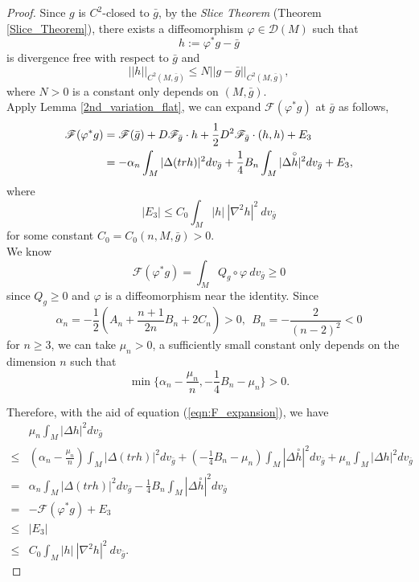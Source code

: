 \documentclass[12pt]{amsart}
\theoremstyle{definition}
\theoremstyle{remark}
\numberwithin{equation}{section}
\begin{document}
\begin{proof}

Since $g$ is $C^2$-closed to $\bar{g}$, by the \emph{Slice Theorem} (Theorem \ref{Slice_Theorem}), there exists a diffeomorphism $\varphi \in \mathscr{D}( M ) $ such that $$h := \varphi^* g - \bar{g}$$ is divergence free with respect to $\bar{g}$ and $$||h||_{C^2(M,\bar{g})} \leq N ||g-\bar{g}||_{C^2(M,\bar{g})},$$ where $N > 0$ is a constant only depends on $(M,\bar{g})$.\\

Apply Lemma \ref{2nd_variation_flat}, we can expand $\mathscr{F}(\varphi^*g)$ at $\bar{g}$ as follows,
\begin{align}\label{eqn:F_expansion}
\mathscr{F}(\varphi^*g) &= \mathscr{F}(\bar g) + D\mathscr{F}_{\bar g} \cdot h + \frac{1}{2}D^2 \mathscr{F}_{\bar g} \cdot (h, h) + E_3\\
\notag   &=   - \alpha_n \int_M|\Delta(tr h)|^2 dv_{\bar{g}} + \frac{1}{4}B_n\int_M |\Delta \overset{\circ}{h}|^2 dv_{\bar{g}} + E_3,
\end{align}
where $$|E_3| \leq C_0 \int_M |h|\ |\nabla^2 h|^2 \ dv_{\bar{g}}$$ for some constant $C_0=C_0 (n, M, \bar g)> 0$.\\

We know $$\mathscr{F}(\varphi^*g) = \int_M Q_g\circ\varphi\ dv_{\bar{g}} \geq 0$$ since $Q_{g}\geq0$ and $\varphi$ is a diffeomorphism near the identity. Since
$$\alpha_n =-\frac{1}{2}\left(A_n + \frac{n+1}{2n}B_n + 2C_n \right) > 0,\ \ B_n = - \frac{2}{(n-2)^2} < 0$$ for $n\geq 3$, we can take 
$\mu_n > 0$, a sufficiently small constant only depends on the dimension $n$ such that
$$\min\{ \alpha_n - \frac{\mu_n}{n} , - \frac{1}{4}B_n- \mu_n\} > 0.$$

Therefore, with the aid of equation (\ref{eqn:F_expansion}), we have
\begin{align*}
&\mu_n \int_M |\Delta h|^2 dv_{\bar{g}}\\
\leq& \left( \alpha_n - \frac{\mu_n}{n}\right)\int_M|\Delta(tr h)|^2 dv_{\bar{g}} + \left( - \frac{1}{4}B_n- \mu_n \right)\int_M |\Delta \overset{\circ}{h}|^2 dv_{\bar{g}} + \mu_n \int_M |\Delta h|^2 dv_{\bar{g}}\\
=&  \alpha_n \int_M|\Delta(tr h)|^2 dv_{\bar{g}} - \frac{1}{4}B_n\int_M |\Delta \overset{\circ}{h}|^2 dv_{\bar{g}}\\
=& - \mathscr{F}(\varphi^*g) + E_3\\
\leq& |E_3|\\
\leq& C_0 \int_M |h|\ |\nabla^2{h}|^2 \ dv_{\bar{g}}.
\end{align*}


\end{proof}
\end{document}
